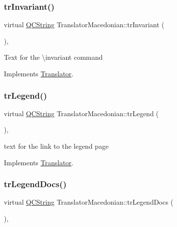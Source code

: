 \subsubsection{\texorpdfstring{trInvariant()}{trInvariant()}}
{\footnotesize\ttfamily virtual \mbox{\hyperlink{class_q_c_string}{Q\+C\+String}} Translator\+Macedonian\+::tr\+Invariant (\begin{DoxyParamCaption}{ }\end{DoxyParamCaption})\hspace{0.3cm}{\ttfamily [inline]}, {\ttfamily [virtual]}}

Text for the \textbackslash{}invariant command 

Implements \mbox{\hyperlink{class_translator}{Translator}}.

\mbox{\label{class_translator_macedonian_a141299579a7ae8b7cd7129365b0b716b}} 
\subsubsection{\texorpdfstring{trLegend()}{trLegend()}}
{\footnotesize\ttfamily virtual \mbox{\hyperlink{class_q_c_string}{Q\+C\+String}} Translator\+Macedonian\+::tr\+Legend (\begin{DoxyParamCaption}{ }\end{DoxyParamCaption})\hspace{0.3cm}{\ttfamily [inline]}, {\ttfamily [virtual]}}

text for the link to the legend page 

Implements \mbox{\hyperlink{class_translator}{Translator}}.

\mbox{\label{class_translator_macedonian_a72d0a47420f52cae8bf1f0dc6b2e361f}} 
\subsubsection{\texorpdfstring{trLegendDocs()}{trLegendDocs()}}
{\footnotesize\ttfamily virtual \mbox{\hyperlink{class_q_c_string}{Q\+C\+String}} Translator\+Macedonian\+::tr\+Legend\+Docs (\begin{DoxyParamCaption}{ }\end{DoxyParamCaption})\hspace{0.3cm}{\ttfamily [inline]}, {\ttfamily [virtual]}}

